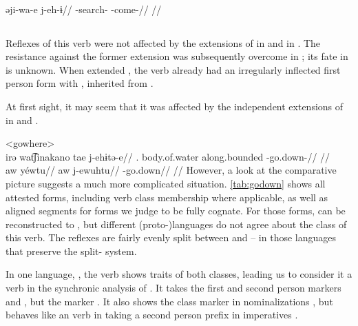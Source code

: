 \carijo \parencite[][102]{guerrero2019carijo}\\
\begingl
\gla əji-wa-e j-eh-ɨ//
\glb {}-search- -come-//
\glft {}//
\endgl
\xe

\subsection{ }
\label{sec:godown}
Reflexes of this verb were not affected by the extensions of  in \PPek {} and  in \akuriyo {}.
The resistance against the former extension was subsequently overcome in \bakairi; its fate in \ikpeng is unknown.
When \akuriyo extended , the verb already had an irregularly inflected first person form with , inherited from \PTir.

At first sight, it may seem that it was affected by the independent extensions of  in \carijo {} and \yukpa {}.

\pex<gowhere>
 \carijo {}\\
\begingl
\gla irə wat͡ʃinakano tae j-ehɨtə-e//
\glb {}. body.of.water along.bounded -go.down-//
\glft {}//
\endgl
{} \yukpa \parencite[][]{meira2003primeras}\\
\begingl
\glpreamble aw yéwtu//
\gla aw j-ewuhtu//
\glb {} -go.down//
\glft {}//
\endgl
\xe
%
However, a look at the comparative picture suggests a much more complicated situation.
\cref{tab:godown} shows all attested forms, including verb class membership where applicable, as well as aligned segments for forms we judge to be fully cognate.
For those forms,  can be reconstructed to \PC, but different (proto-)languages do not agree about the class of this verb.
The reflexes are fairly evenly split between  and  -- in those languages that preserve the split- system.



In one language, \wayana, the verb shows traits of both classes, leading us to consider it a  verb in the synchronic analysis of \wayana.
It takes the first and second person  markers  and  \parencite[200]{wayanatavares2005}, but the  marker  \parencite[206]{wayanatavares2005}.
It also shows the  class marker  in nominalizations , but behaves like an  verb in taking a second person prefix in imperatives .

